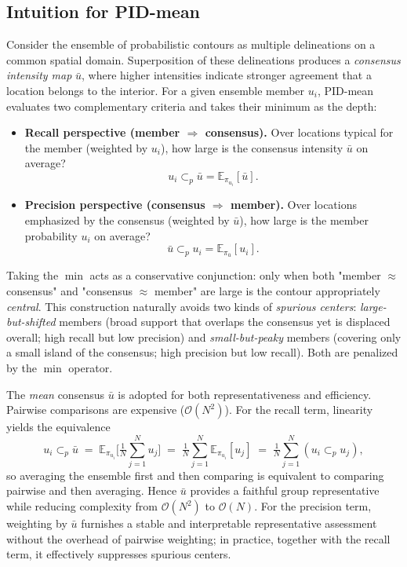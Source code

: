 \documentclass[review,journal]{vgtc}              %
\begin{document}
\subsection{Intuition for PID-mean}
Consider the ensemble of probabilistic contours as multiple delineations on a common spatial domain. Superposition of these delineations produces a \emph{consensus intensity map} $\bar u$, where higher intensities indicate stronger agreement that a location belongs to the interior. For a given ensemble member $u_i$, PID-mean evaluates two complementary criteria and takes their minimum as the depth:
\begin{itemize}
    \item \textbf{Recall perspective (member $\Rightarrow$ consensus).} Over locations typical for the member (weighted by $u_i$), how large is the consensus intensity $\bar u$ on average?
    \[
    u_i \subset_{\!p} \bar u = \mathbb{E}_{\pi_{u_i}}[\bar u].
    \]
    \item \textbf{Precision perspective (consensus $\Rightarrow$ member).} Over locations emphasized by the consensus (weighted by $\bar u$), how large is the member probability $u_i$ on average?
    \[
    \bar u \subset_{\!p} u_i = \mathbb{E}_{\pi_{\bar u}}[u_i].
    \]
\end{itemize}
Taking the $\min$ acts as a conservative conjunction: only when both "member $\approx$ consensus" and "consensus $\approx$ member" are large is the contour appropriately \emph{central}. This construction naturally avoids two kinds of \emph{spurious centers}: \emph{large-but-shifted} members (broad support that overlaps the consensus yet is displaced overall; high recall but low precision) and \emph{small-but-peaky} members (covering only a small island of the consensus; high precision but low recall). Both are penalized by the $\min$ operator.

The \emph{mean} consensus $\bar u$ is adopted for both representativeness and efficiency. Pairwise comparisons are expensive ($\mathcal{O}(N^2)$). For the recall term, linearity yields the equivalence
\[
 u_i \subset_{\!p} \bar u 
 \;=\; \mathbb{E}_{\pi_{u_i}}\!\Big[\tfrac1N\sum_{j=1}^N u_j\Big]
 \;=\; \tfrac1N\sum_{j=1}^N \mathbb{E}_{\pi_{u_i}}[u_j]
 \;=\; \tfrac1N\sum_{j=1}^N (u_i \subset_{\!p} u_j),
\]
so averaging the ensemble first and then comparing is equivalent to comparing pairwise and then averaging. Hence $\bar u$ provides a faithful group representative while reducing complexity from $\mathcal{O}(N^2)$ to $\mathcal{O}(N)$. For the precision term, weighting by $\bar u$ furnishes a stable and interpretable representative assessment without the overhead of pairwise weighting; in practice, together with the recall term, it effectively suppresses spurious centers.
\end{document}
